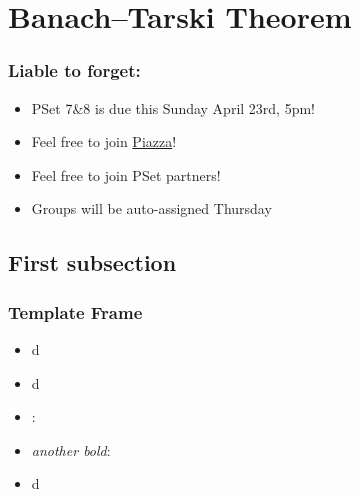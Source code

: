﻿%






\setcounter{section}{7} 

\section{Banach--Tarski Theorem}

\begin{frame}

\scriptsize{\tableofcontents}

\end{frame}


\begin{frame}
\frametitle{Liable to forget:}

\begin{itemize}[<+->]

\item PSet 7\&8 is due this Sunday April 23rd, 5pm!


\item Feel free to join \href{https://piazza.com/mit/spring2023/24118}{Piazza}! 

\item Feel free to join PSet partners!
\item[] Groups will be auto-assigned Thursday 


\end{itemize}
\end{frame}

\subsection{First subsection}

\begin{frame}
\frametitle{Template Frame}

\begin{itemize}[<+->]
\item d

\item[] d

\item {}:
\item[] \emph{another bold}: 

\item d

\end{itemize}
\end{frame}